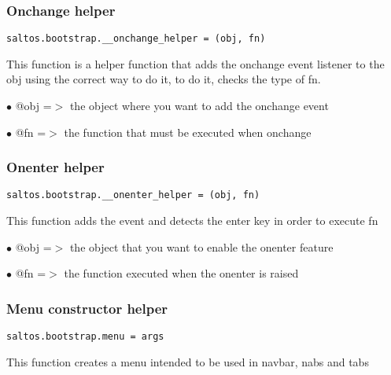 \documentclass[a4paper]{article}
\begin{document}
\hypertarget{toc658}{}
\subsubsection{Onchange helper}

\begin{lstlisting}
saltos.bootstrap.__onchange_helper = (obj, fn)
\end{lstlisting}

This function is a helper function that adds the onchange event listener to the obj
using the correct way to do it, to do it, checks the type of fn.

\begin{compactitem}
\item[\color{myblue}$\bullet$] @obj   =$>$ the object where you want to add the onchange event
\item[\color{myblue}$\bullet$] @fn    =$>$ the function that must be executed when onchange
\end{compactitem}

\hypertarget{toc659}{}
\subsubsection{Onenter helper}

\begin{lstlisting}
saltos.bootstrap.__onenter_helper = (obj, fn)
\end{lstlisting}

This function adds the event and detects the enter key in order to execute fn

\begin{compactitem}
\item[\color{myblue}$\bullet$] @obj =$>$ the object that you want to enable the onenter feature
\item[\color{myblue}$\bullet$] @fn  =$>$ the function executed when the onenter is raised
\end{compactitem}

\hypertarget{toc660}{}
\subsubsection{Menu constructor helper}

\begin{lstlisting}
saltos.bootstrap.menu = args
\end{lstlisting}

This function creates a menu intended to be used in navbar, nabs and tabs
\end{document}
